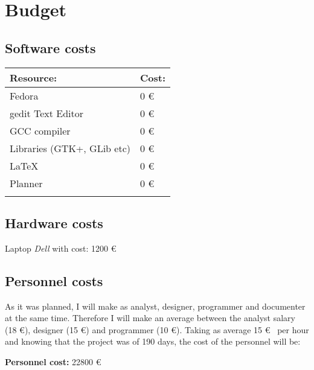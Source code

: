 
\chapter{Budget}

\section{Software costs}\label{sec:SoftwareCosts}

\begin{center}
  \begin{tabularx}{0.75\textwidth}{|X|X|}
    \firsthline
    \textbf{Resource:} & \textbf{Cost:} \\
    \hline
    Fedora & 0 \euro \\
    \hline
    gedit Text Editor & 0 \euro \\
    \hline
    GCC compiler & 0 \euro \\
    \hline
    Libraries (GTK+, GLib etc) & 0 \euro \\
    \hline
    \LaTeX & 0 \euro \\
    \hline
    Planner & 0 \euro \\
    \lasthline
  \end{tabularx}
\end{center}

\section{Hardware costs}\label{sec:HardwareCosts}

Laptop \emph{Dell} with cost: 1200 \euro

\section{Personnel costs}\label{sec:PersonnelCosts}

As it was planned, I will make as analyst, designer, programmer and documenter at the same time. Therefore I will make an average between the analyst salary (18 \euro), designer (15 \euro) and programmer (10 \euro). Taking as average 15 \euro~ per hour and knowing that the project was of 190 days, the cost of the personnel will be:

\textbf{Personnel cost:} 22800 \euro
